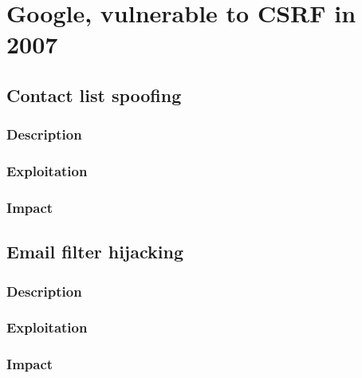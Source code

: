 \documentclass[a4paper,11pt,openany]{report}
\begin{document}
%   
  

  \section{Google, vulnerable to CSRF in 2007}
  
  \subsection{Contact list spoofing}
  \subsubsection{Description}
  \subsubsection{Exploitation}
  \subsubsection{Impact}
  
  
  \subsection{Email filter hijacking}
  \subsubsection{Description}
  \subsubsection{Exploitation}
  \subsubsection{Impact}
  
\end{document}
